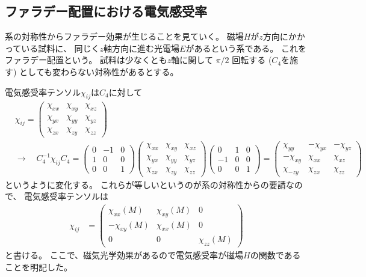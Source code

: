 \documentclass[9pt,dvipdfmx,a4paper]{jsarticle}
\begin{document}
\subsection{ファラデー配置における電気感受率}
系の対称性からファラデー効果が生じることを見ていく。
磁場\(H\)が\(z\)方向にかかっている試料に、
同じく\(z\)軸方向に進む光電場\(E\)があるという系である。
これをファラデー配置という。
試料は少なくとも\(z\)軸に関して \(\pi/2\) 回転する (\(C_4\)を施す) としても変わらない対称性があるとする。

電気感受率テンソル\(\chi_{ij}\)は\(C_4\)に対して
\begin{align}
    &\chi_{ij}
    = \begin{pmatrix}
        \chi_{xx} & \chi_{xy} & \chi_{xz}\\
        \chi_{yx} & \chi_{yy} & \chi_{yz}\\
        \chi_{zx} & \chi_{zy} & \chi_{zz}
    \end{pmatrix}\\
    &\rightarrow\quad
    C_4^{-1}\chi_{ij}C_4
    = \begin{pmatrix}
        0 & -1 & 0\\
        1 & 0 & 0\\
        0 & 0 & 1
    \end{pmatrix}
    \begin{pmatrix}
        \chi_{xx} & \chi_{xy} & \chi_{xz}\\
        \chi_{yx} & \chi_{yy} & \chi_{yz}\\
        \chi_{zx} & \chi_{zy} & \chi_{zz}
    \end{pmatrix}
    \begin{pmatrix}
        0 & 1 & 0\\
        -1 & 0 & 0\\
        0 & 0 & 1
    \end{pmatrix}
    = \begin{pmatrix}
        \chi_{yy} & -\chi_{yx} & -\chi_{yz}\\
        -\chi_{xy} & \chi_{xx} & \chi_{xz}\\
        \chi_{-zy} & \chi_{zx} & \chi_{zz}
    \end{pmatrix}
\end{align}
というように変化する。
これらが等しいというのが系の対称性からの要請なので、
電気感受率テンソルは
\begin{align}
    \chi_{ij}
    &= \begin{pmatrix}
        \chi_{xx}(M) & \chi_{xy}(M) & 0\\
        -\chi_{xy}(M) & \chi_{xx}(M) & 0\\
        0 & 0 & \chi_{zz}(M)
    \end{pmatrix}
\end{align}
と書ける。
ここで、磁気光学効果があるので電気感受率が磁場\(H\)の関数であることを明記した。
\end{document}

